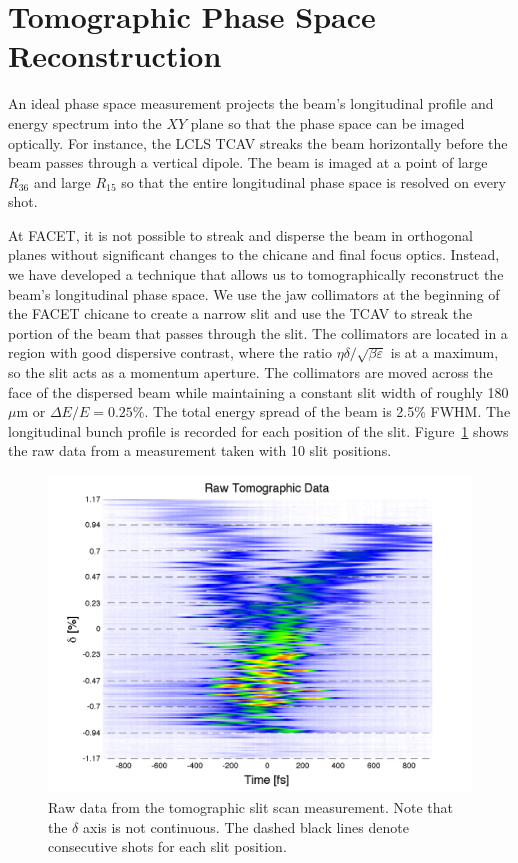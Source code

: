 \documentclass[%
twocolumn,
showpacs,preprintnumbers,
 aps,
prstab,
]{revtex4-1}
\begin{document}
\section{Tomographic Phase Space Reconstruction}\label{sec:tomo}
An ideal phase space measurement projects the beam's longitudinal profile and energy spectrum into the $XY$ plane so that the phase space can be imaged optically. For instance, the LCLS TCAV streaks the beam horizontally before the beam passes through a vertical dipole. The beam is imaged at a point of large $R_{36}$ and large $R_{15}$ so that the entire longitudinal phase space is resolved on every shot. 

At FACET, it is not possible to streak and disperse the beam in orthogonal planes without significant changes to the chicane and final focus optics. Instead, we have developed a technique that allows us to tomographically reconstruct the beam's longitudinal phase space.  We use the jaw collimators at the beginning of the FACET chicane to create a narrow slit and use the TCAV to streak the portion of the beam that passes through the slit. The collimators are located in a region with good dispersive contrast, where the ratio $\eta \delta / \sqrt{\beta \varepsilon}$ is at a maximum, so the slit acts as a momentum aperture. The collimators are moved across the face of the dispersed beam while maintaining a constant slit width of roughly 180 $\mu$m or $\Delta E/E = 0.25\%$. The total energy spread of the beam is 2.5\% FWHM. The longitudinal bunch profile is recorded for each position of the slit. Figure~\ref{raw_data} shows the raw data from a measurement taken with 10 slit positions.

\begin{figure}[hbt]
  \includegraphics[width=\columnwidth]{figures/raw.pdf}
  \caption{Raw data from the tomographic slit scan measurement. Note that the $\delta$ axis is not continuous. The dashed black lines denote consecutive shots for each slit position.}
  \label{raw_data}
\end{figure}
\end{document}
